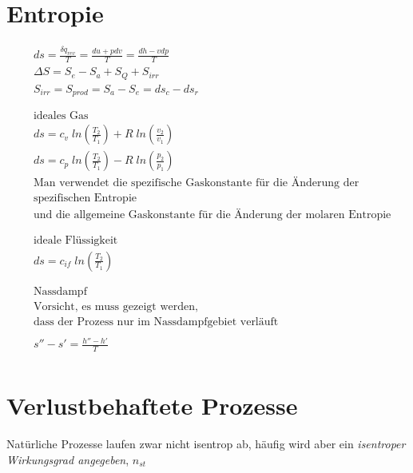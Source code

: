 \documentclass[12pt]{article}
\begin{document}
\pagebreak
\section{Entropie}
\begin{tcolorbox}[colback=backblue,colframe=borderblue,title=Important]

\begin{align*}
&ds=\frac{\delta q_{rev}}{T}=\frac{du + pdv}{T}=\frac{dh-vdp}{T}\\
&\Delta S=S_e-S_a+S_Q+S_{irr}\\
&S_{irr}=S_{prod}=S_a-S_e=ds_c-ds_r \\ \\
 \\
&\text{ideales Gas}\\
&ds=c_v \; ln\left(\frac{T_2}{T_1}\right)+R\;ln\left(\frac{v_2}{v_1}\right) \\
&ds=c_p\;ln\left(\frac{T_2}{T_1}\right)-R\;ln\left(\frac{p_2}{p_1}\right)\\
&\text{Man verwendet die spezifische Gaskonstante für die Änderung der}\\
&\text{spezifischen Entropie}\\
&\text{und die allgemeine Gaskonstante für die Änderung der molaren Entropie}\\
\\ \\
&\text{ideale Flüssigkeit}\\
&ds=c_{if} \; ln\left(\frac{T_2}{T_1}\right)\\ \\
 \\
&\text{Nassdampf}\\
&\text{Vorsicht, es muss gezeigt werden,}\\
&\text{dass der Prozess nur im Nassdampfgebiet verläuft}\\ \\
&s''-s'=\frac{h''-h'}{T}\\
\end{align*}
\end{tcolorbox}

\pagebreak

\section{Verlustbehaftete Prozesse}

Natürliche Prozesse laufen zwar nicht isentrop ab, häufig wird aber ein \textit{isentroper Wirkungsgrad angegeben}, $n_{st}$
\end{document}
